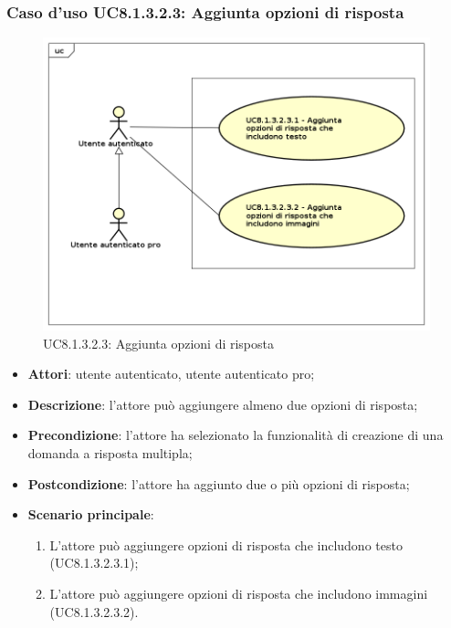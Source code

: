 \subsubsection{Caso d'uso UC8.1.3.2.3: Aggiunta opzioni di risposta}
	\label{UC8.1.3.2.3}
	\begin{figure}[h]
		\centering
			\includegraphics[scale=0.45,keepaspectratio]{UML/UC8_1_3_2_3.png}
		\caption{UC8.1.3.2.3: Aggiunta opzioni di risposta}
	\end{figure}
	\FloatBarrier
	\begin{itemize}
		\item
			\textbf{Attori}: utente autenticato, utente autenticato pro;
		\item		
			\textbf{Descrizione}: l'attore può aggiungere almeno due opzioni di risposta;
		\item
			\textbf{Precondizione}: l'attore ha selezionato la funzionalità di creazione di una domanda a risposta multipla;
		\item
			\textbf{Postcondizione}: l'attore ha aggiunto due o più opzioni di risposta;
		\item
			\textbf{Scenario principale}:
	       		\begin{enumerate}
	       			\item
	       			L'attore può aggiungere opzioni di risposta che includono testo (UC8.1.3.2.3.1);
					\item
					L'attore può aggiungere opzioni di risposta che includono immagini (UC8.1.3.2.3.2).
	 			\end{enumerate}
	\end{itemize}	

